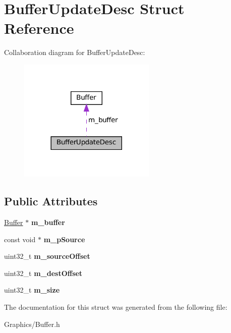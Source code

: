 \hypertarget{structBufferUpdateDesc}{}\section{Buffer\+Update\+Desc Struct Reference}
\label{structBufferUpdateDesc}


Collaboration diagram for Buffer\+Update\+Desc\+:\nopagebreak
\begin{figure}[H]
\begin{center}
\leavevmode
\includegraphics[width=185pt]{structBufferUpdateDesc__coll__graph}
\end{center}
\end{figure}
\subsection*{Public Attributes}
\begin{DoxyCompactItemize}
\item 
\mbox{\label{structBufferUpdateDesc_ade220b235f3023166d572729aaca6b39}} 
\hyperlink{classBuffer}{Buffer} $\ast$ {\bfseries m\+\_\+buffer}
\item 
\mbox{\label{structBufferUpdateDesc_a91446ea04ab679e342aeec70e8f1d639}} 
const void $\ast$ {\bfseries m\+\_\+p\+Source}
\item 
\mbox{\label{structBufferUpdateDesc_a45260587c314ad5b3f13d12fc319d627}} 
uint32\+\_\+t {\bfseries m\+\_\+source\+Offset}
\item 
\mbox{\label{structBufferUpdateDesc_a0c7a966925823826f53fe61fb11970a4}} 
uint32\+\_\+t {\bfseries m\+\_\+dest\+Offset}
\item 
\mbox{\label{structBufferUpdateDesc_a739cfc54bbe93d4ec27ce7ddae82c7df}} 
uint32\+\_\+t {\bfseries m\+\_\+size}
\end{DoxyCompactItemize}


The documentation for this struct was generated from the following file\+:\begin{DoxyCompactItemize}
\item 
Graphics/Buffer.\+h\end{DoxyCompactItemize}
